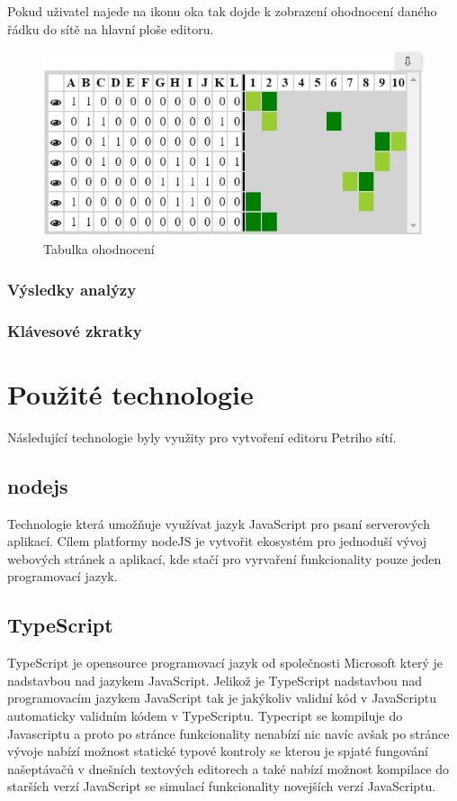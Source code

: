 \documentclass[
  biblatex,
  glossaries,
  index
]{kidiplom}
\begin{document}
Pokud uživatel najede na ikonu oka tak dojde k zobrazení ohodnocení 
daného řádku do sítě na hlavní ploše editoru.

\begin{figure}[h]
  \centering
  \includegraphics[width=\linewidth]{tabulka}
  \caption{Tabulka ohodnocení}\label{fig:Tabulka ohodnocení obrázek}
\end{figure}


\subsubsection{Výsledky analýzy}\label{výsledky analýzy}


\subsubsection{Klávesové zkratky}\label{zkratky}





\section{Použité technologie}

Následující technologie byly využity pro vytvoření editoru Petriho sítí.

\subsection{nodejs}
Technologie která umožňuje využívat jazyk JavaScript pro psaní 
serverových aplikací. Cílem platformy nodeJS je vytvořit
ekosystém pro jednoduší vývoj webových stránek a aplikací, 
kde stačí pro vyrvaření funkcionality pouze jeden programovací jazyk.

\subsection{TypeScript}
TypeScript je opensource programovací jazyk od společnosti Microsoft který je nadstavbou nad jazykem JavaScript.
Jelikož je TypeScript nadstavbou nad programovacím jazykem JavaScript tak je jakýkoliv validní kód v JavaScriptu automaticky validním kódem v TypeScriptu.
Typecript se kompiluje do Javascriptu a proto po stránce funkcionality nenabízí nic navíc avšak po stránce vývoje nabízí možnost statické typové kontroly
se kterou je spjaté fungování našeptávačů v dnešních textových editorech a také nabízí možnost kompilace do starších verzí JavaScript se simulací funkcionality novejších verzí JavaScriptu.
\end{document}
